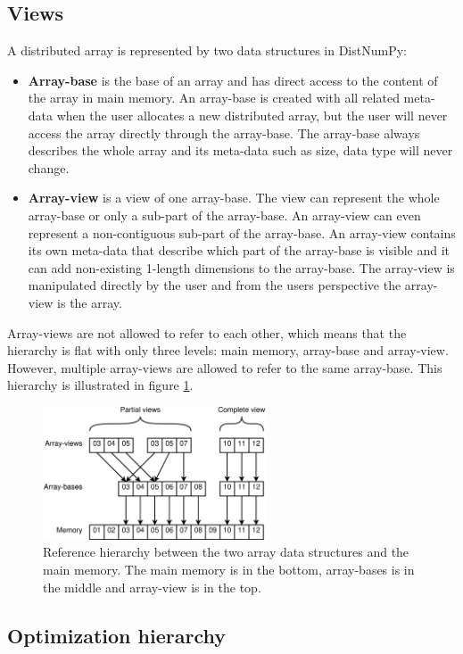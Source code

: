 \documentclass[10pt]{article}
\begin{document}
\subsection{Views}
A distributed array is represented by two data structures in DistNumPy:
\begin{itemize}
\item \textbf{Array-base} is the base of an array and has direct access to the content of the array in main memory. An array-base is created with all related meta-data when the user allocates a new distributed array, but the user will never access the array directly through the array-base. The array-base always describes the whole array and its meta-data such as size, data type will never change.
\item \textbf{Array-view} is a view of one array-base. The view can represent the whole array-base or only a sub-part of the array-base. An array-view can even represent a non-contiguous sub-part of the array-base. An array-view contains its own meta-data that describe which part of the array-base is visible and it can add non-existing 1-length dimensions to the array-base. The array-view is manipulated directly by the user and from the users perspective the array-view is the array.
\end{itemize}
Array-views are not allowed to refer to each other, which means that the hierarchy is flat with only three levels: main memory, array-base and array-view. However, multiple array-views are allowed to refer to the same array-base. This hierarchy is illustrated in figure \ref{fig:views}. 

\begin{figure}
 \centering
 \includegraphics[width=250px]{gfx/views}
 \caption{Reference hierarchy between the two array data structures and the main memory. The main memory is in the bottom, array-bases is in the middle and array-view is in the top.}
 \label{fig:views}
\end{figure}

\subsection{Optimization hierarchy}
\end{document}

